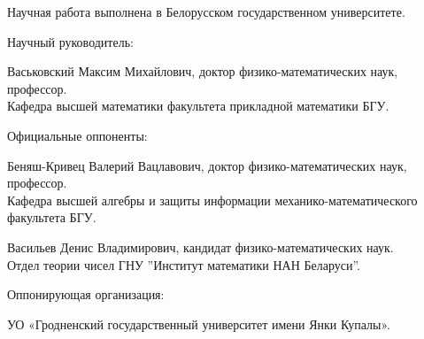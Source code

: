 \documentclass[_00_autoref.tex]{subfiles}
\begin{document}
\pagestyle{empty}
\setlength{\voffset}{-18mm}
\noindent Научная работа выполнена в Белорусском государственном университете.

\noindent
\begin{minipage}[t]{0.38\textwidth}
  \begin{flushleft}
    Научный руководитель:
  \end{flushleft}
\end{minipage}
\begin{minipage}[t]{0.61\textwidth}
  \begin{flushleft}
    Васьковский Максим Михайлович, доктор физико-математических наук, профессор.\\
    Кафедра высшей математики факультета прикладной математики БГУ.
  \end{flushleft}
\end{minipage}

\medskip
\noindent
\begin{minipage}[t]{0.38\textwidth}
    \begin{flushleft}
        Официальные оппоненты:
    \end{flushleft}
\end{minipage}
\begin{minipage}[t]{0.61\textwidth}
    \begin{flushleft}
        Беняш-Кривец Валерий Вацлавович, доктор физико-математических наук, профессор.\\
        Кафедра высшей алгебры и защиты информации механико-математического факультета БГУ.

        Васильев Денис Владимирович, кандидат физико-математических наук.\\
        Отдел теории чисел ГНУ ''Институт математики НАН Беларуси''.
\medskip
  \end{flushleft}
\end{minipage}

\medskip
\noindent
\begin{minipage}[t]{0.38\textwidth}
    \begin{flushleft}
        Оппонирующая организация:
    \end{flushleft}
\end{minipage}
\begin{minipage}[t]{0.61\textwidth}
    \begin{flushleft}
        УО «Гродненский государственный университет имени Янки Купалы».
    \medskip
  \end{flushleft}
\end{minipage}
\end{document}
